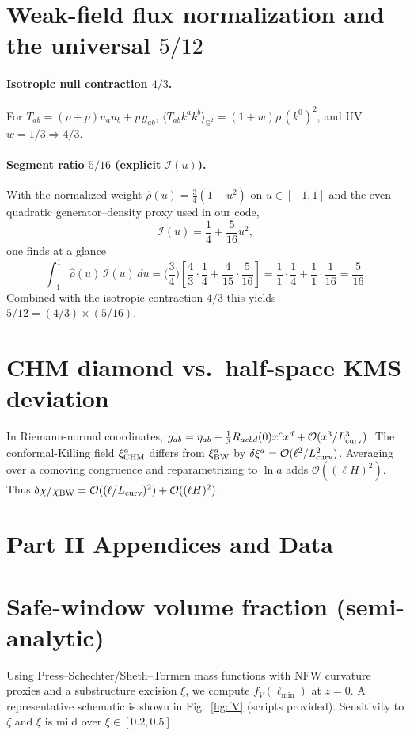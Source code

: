 \documentclass[aps,prd,onecolumn,superscriptaddress,nofootinbib]{revtex4-2}
\begin{document}
\section{Weak-field flux normalization and the universal \texorpdfstring{$5/12$}{5/12}}
\label{app:five-twelve}
\paragraph{Isotropic null contraction \(4/3\).} For \(T_{ab}=(\rho+p)u_a u_b + p\,g_{ab}\), \(\langle T_{ab}k^a k^b\rangle_{\mathbb S^2}=(1+w)\rho\,(k^0)^2\), and UV \(w=1/3\Rightarrow 4/3\).

\paragraph{Segment ratio \(5/16\) (explicit \(\mathcal I(u)\)).}
With the normalized weight \(\hat\rho(u)=\tfrac{3}{4}(1-u^2)\) on \(u\in[-1,1]\) and the even–quadratic generator–density proxy used in our code,
\[
\mathcal I(u)=\frac{1}{4}+\frac{5}{16}u^2,
\]
one finds at a glance
\[
\int_{-1}^{1}\! \hat\rho(u)\,\mathcal I(u)\,du
=\Big(\frac{3}{4}\Big)\!\left[\frac{4}{3}\cdot\frac{1}{4}+\frac{4}{15}\cdot\frac{5}{16}\right]
=\frac{1}{1}\cdot\frac{1}{4}+\frac{1}{1}\cdot\frac{1}{16}
=\frac{5}{16}.
\]
Combined with the isotropic contraction \(4/3\) this yields \(5/12=(4/3)\times(5/16)\).

\section{CHM diamond vs.\ half-space KMS deviation}
\label{app:chm-kms-estimate}
In Riemann-normal coordinates,
\(g_{ab}=\eta_{ab}-\tfrac{1}{3}R_{acbd}(0)x^c x^d+\mathcal O(x^3/L_{\rm curv}^3)\).
The conformal-Killing field \(\xi^a_{\rm CHM}\) differs from \(\xi^a_{\rm BW}\) by \(\delta\xi^a=\mathcal O(\ell^2/L_{\rm curv}^2)\).
Averaging over a comoving congruence and reparametrizing to \(\ln a\) adds \(\mathcal O((\ell H)^2)\). Thus
\(\delta\chi/\chi_{\rm BW}=\mathcal O((\ell/L_{\rm curv})^2)+\mathcal O((\ell H)^2)\).

\section*{Part II Appendices and Data}

\section{Safe-window volume fraction (semi-analytic)}
\label{app:fv}
Using Press--Schechter/Sheth--Tormen mass functions with NFW curvature proxies and a substructure excision \(\xi\), we compute \(f_V(\ell_{\min})\) at \(z\!=\!0\). A representative schematic is shown in Fig.~\ref{fig:fV} (scripts provided). Sensitivity to \(\zeta\) and \(\xi\) is mild over \(\xi\in[0.2,0.5]\).
\end{document}
